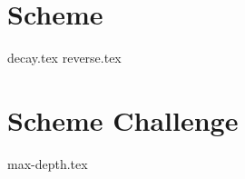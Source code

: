 \documentclass{exam}
\begin{document}
\newpage
\section{Scheme}
\begin{questions}
{decay.tex}
\newpage
{reverse.tex}
\end{questions}

\section{Scheme Challenge}
\begin{questions}
{max-depth.tex}
\end{questions}


\end{document}
